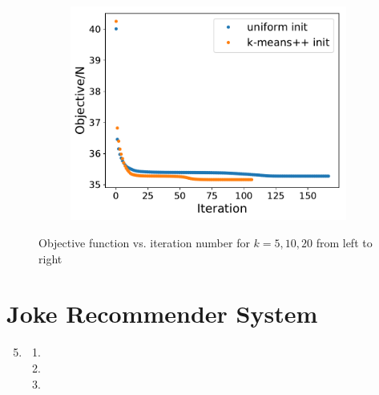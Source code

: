\documentclass[11pt,letterpaper]{article}
\theoremstyle{definition}
\theoremstyle{plain}
\numberwithin{equation}{section}
\numberwithin{figure}{section}
\begin{document}
\begin{enumerate}
\begin{enumerate}
\begin{figure}[H]
\begin{subfigure}[t]{.32\textwidth}
				\includegraphics[width=\textwidth]{figures/20-objective.pdf}
			\end{subfigure}

			\caption{Objective function vs. iteration number for $k = 5,10,20$ from left to right}
		\end{figure}
		\label{fig:km_objs}
	\end{enumerate}
\end{enumerate}
















\section{Joke Recommender System}
\begin{enumerate}
\setcounter{enumi}{4}
	\item \begin{enumerate}
		\item
		\item 
		\item 
	\end{enumerate}
\end{enumerate}
\end{document}
